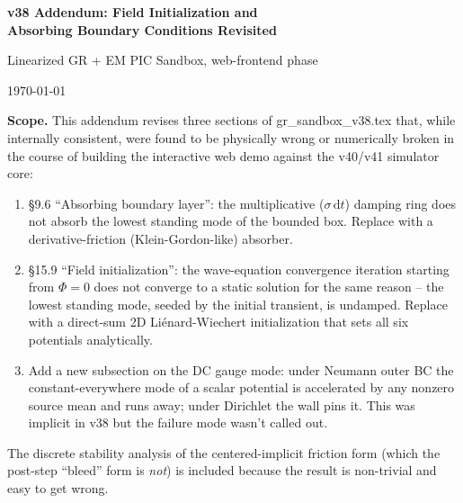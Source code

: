 \documentclass[11pt,a4paper]{article}
\newcommand{\dd}{\mathrm{d}}
\begin{document}

\begin{center}
  {\Large\bfseries\color{deepblue} v38 Addendum: Field Initialization and \\[2pt]
   Absorbing Boundary Conditions Revisited\par}
  \vspace{0.4cm}
  {\small Linearized GR + EM PIC Sandbox, web-frontend phase\par}
  \vspace{0.2cm}
  {\small \today\par}
\end{center}

\vspace{0.5cm}

\begin{shaded}
\textbf{Scope.}  This addendum revises three sections of
gr\_sandbox\_v38.tex that, while internally consistent, were found to
be physically wrong or numerically broken in the course of building
the interactive web demo against the v40/v41 simulator core:
\begin{enumerate}[leftmargin=*,nosep]
  \item \S 9.6 ``Absorbing boundary layer'': the multiplicative
    ($\sigma\,\dd t$) damping ring does not absorb the lowest standing
    mode of the bounded box.  Replace with a derivative-friction
    (Klein-Gordon-like) absorber.
  \item \S 15.9 ``Field initialization'': the wave-equation
    convergence iteration starting from $\Phi=0$ does not converge to
    a static solution for the same reason -- the lowest standing
    mode, seeded by the initial transient, is undamped.  Replace
    with a direct-sum 2D Li{\'e}nard-Wiechert initialization that
    sets all six potentials analytically.
  \item Add a new subsection on the DC gauge mode: under Neumann
    outer BC the constant-everywhere mode of a scalar potential is
    accelerated by any nonzero source mean and runs away; under
    Dirichlet the wall pins it.  This was implicit in v38 but the
    failure mode wasn't called out.
\end{enumerate}
The discrete stability analysis of the centered-implicit friction
form (which the post-step ``bleed'' form is \emph{not}) is included
because the result is non-trivial and easy to get wrong.
\end{shaded}

\tableofcontents
\end{document}
